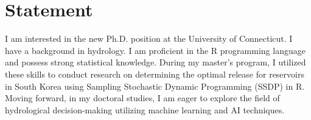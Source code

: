 \section{Statement}
I am interested in the new Ph.D. position at the University of Connecticut. I have a background in hydrology. I am proficient in the R programming language and possess strong statistical knowledge. During my master's program, I utilized these skills to conduct research on determining the optimal release for reservoirs in South Korea using Sampling Stochastic Dynamic Programming (SSDP) in R. Moving forward, in my doctoral studies, I am eager to explore the field of hydrological decision-making utilizing machine learning and AI techniques.

\vspace{0.2em}

